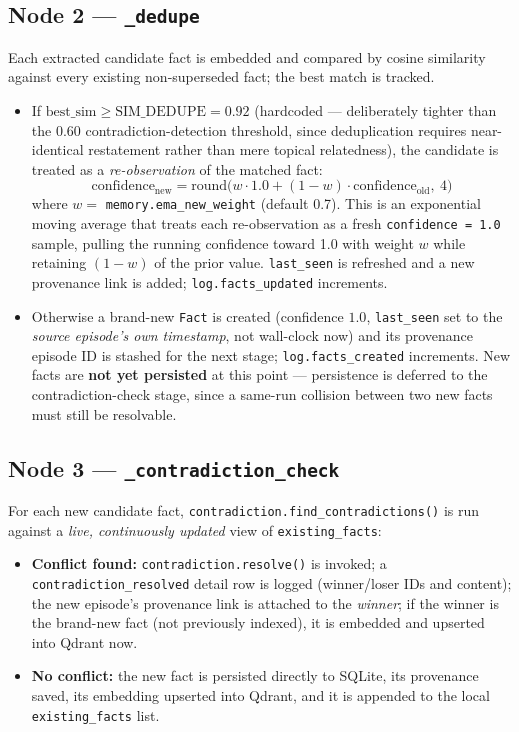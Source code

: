 \documentclass[11pt,a4paper]{report}
\newcommand{\code}[1]{\texttt{\small #1}}
\begin{document}
\subsection{Node 2 — \code{\_dedupe}}
\label{sec:ema}

Each extracted candidate fact is embedded and compared by cosine similarity against every existing non-superseded fact; the best match is tracked.

\begin{itemize}
\item If $\text{best\_sim} \ge \text{SIM\_DEDUPE} = 0.92$ (hardcoded — deliberately tighter than the 0.60 contradiction-detection threshold, since deduplication requires near-identical restatement rather than mere topical relatedness), the candidate is treated as a \emph{re-observation} of the matched fact:
$$
\text{confidence}_{\text{new}} = \text{round}\big(w \cdot 1.0 + (1-w)\cdot \text{confidence}_{\text{old}},\ 4\big)
$$
where $w = $ \code{memory.ema\_new\_weight} (default 0.7). This is an exponential moving average that treats each re-observation as a fresh \code{confidence = 1.0} sample, pulling the running confidence toward 1.0 with weight $w$ while retaining $(1-w)$ of the prior value. \code{last\_seen} is refreshed and a new provenance link is added; \code{log.facts\_updated} increments.
\item Otherwise a brand-new \code{Fact} is created (confidence $1.0$, \code{last\_seen} set to the \emph{source episode's own timestamp}, not wall-clock now) and its provenance episode ID is stashed for the next stage; \code{log.facts\_created} increments. New facts are \textbf{not yet persisted} at this point — persistence is deferred to the contradiction-check stage, since a same-run collision between two new facts must still be resolvable.
\end{itemize}

\subsection{Node 3 — \code{\_contradiction\_check}}

For each new candidate fact, \code{contradiction.find\_contradictions()} is run against a \emph{live, continuously updated} view of \code{existing\_facts}:

\begin{itemize}
\item \textbf{Conflict found:} \code{contradiction.resolve()} is invoked; a \code{contradiction\_resolved} detail row is logged (winner/loser IDs and content); the new episode's provenance link is attached to the \emph{winner}; if the winner is the brand-new fact (not previously indexed), it is embedded and upserted into Qdrant now.
\item \textbf{No conflict:} the new fact is persisted directly to SQLite, its provenance saved, its embedding upserted into Qdrant, and it is appended to the local \code{existing\_facts} list.
\end{itemize}
\end{document}
